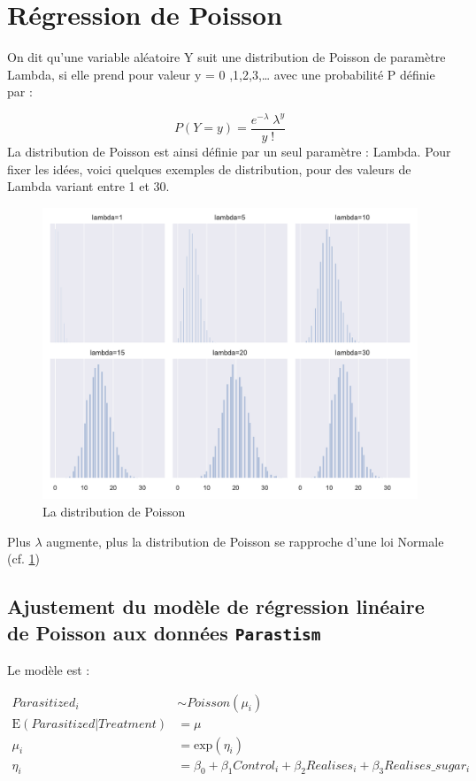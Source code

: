 \documentclass[12pt]{article}
\begin{document}
 \section{Régression de Poisson}
 On dit qu’une variable aléatoire Y suit une distribution de Poisson de paramètre Lambda, si elle prend pour valeur y = 0 ,1,2,3,… avec une probabilité P définie par :
 
 $$
 P({Y=y}) = \frac{e^{-\lambda}\; \lambda^y}{y\;!}
 $$
 La distribution de Poisson est ainsi définie par un seul paramètre : Lambda. Pour fixer les idées, voici quelques exemples de distribution, pour des valeurs de Lambda variant entre 1 et 30.
 
 \begin{figure}[h]
\centering
 \includegraphics[width=.8\textwidth]{histogram poisson dist.pdf}
 \caption{La distribution de Poisson} 
 \label{poiss_dist}
 \end{figure}

Plus $\lambda$ augmente, plus la distribution de Poisson se rapproche d’une loi Normale (cf. \ref{poiss_dist}) 

\subsection{Ajustement du modèle de régression linéaire de Poisson aux données \texttt{Parastism}}

Le modèle est : 

\begin{align*}
Parasitized_i &\sim Poisson(\mu_i)\\
\mathrm{E}({Parasitized|Treatment}) &= \mu\\
\mu_i &= \mathrm{exp}(\eta_i)\\
\eta_i &= \beta_0 + \beta_1 Control_i + \beta_2 Realises_i + \beta_3 Realises\_sugar_i
\end{align*}
\end{document}
